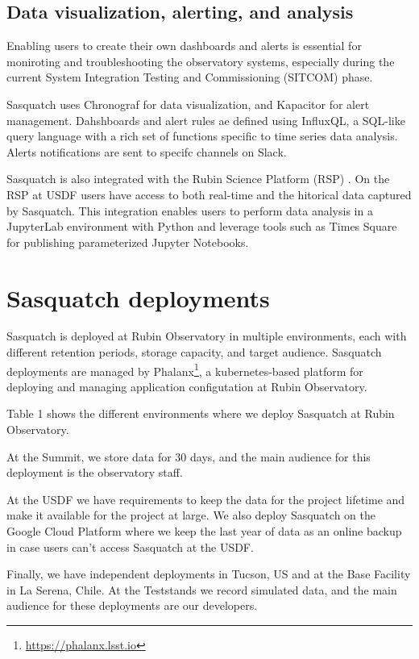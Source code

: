 \subsection{Data visualization, alerting, and analysis}

Enabling users to create their own dashboards and alerts is essential for moniroting and troubleshooting the observatory systems, especially during the current System Integration Testing and Commissioning (SITCOM) phase.

Sasquatch uses Chronograf for data visualization, and Kapacitor for alert management. Dahshboards and alert rules ae defined using InfluxQL, a SQL-like query language with a rich set of functions specific to time series data analysis. Alerts notifications are sent to specifc channels on Slack.

Sasquatch is also integrated with the Rubin Science Platform (RSP) \cite{DMTN-082, DMTN-212}. On the RSP at USDF users have access to both real-time and the hitorical data captured by Sasquatch. This integration enables users to perform data analysis in a JupyterLab environment with Python and leverage tools such as Times Square \cite{SQR-062} for publishing parameterized Jupyter Notebooks.

\section{Sasquatch deployments}
\label{sec:deploy}

Sasquatch is deployed at Rubin Observatory in multiple environments, each with different retention periods, storage capacity, and target audience. Sasquatch deployments are managed by Phalanx\footnote{\url{https://phalanx.lsst.io}}, a kubernetes-based platform for deploying and managing application configutation at Rubin Observatory.

Table 1 shows the different environments where we deploy Sasquatch at Rubin Observatory.

At the Summit, we store data for 30 days, and the main audience for this deployment is the observatory staff.

At the USDF we have requirements to keep the data for the project lifetime and make it available for the project at large. We also deploy Sasquatch on the Google Cloud Platform where we keep the last year of data as an online backup in case users can't access Sasquatch at the USDF.

Finally, we have independent deployments in Tucson, US and at the Base Facility in La Serena, Chile. At the Teststands we record simulated data, and the main audience for these deployments are our developers.

